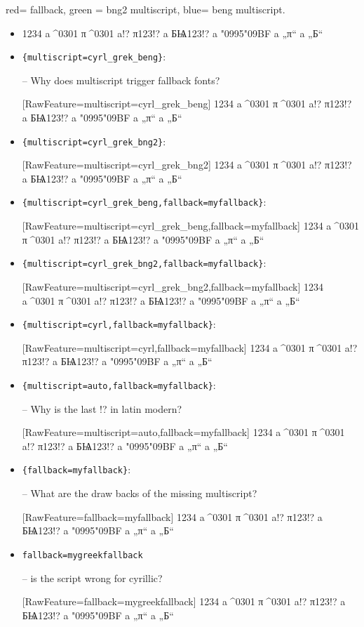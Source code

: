 \documentclass{article}
\newcommand\testtext{1234 a^^^^0301 π^^^^0301 a!? π123!? a БѨ123!? a \char"0995\char"09BF a „π“ a „Б“}
\begin{document}
red= fallback, green = bng2 multiscript, blue= beng multiscript.

\begin{itemize}
\item \testtext

\item \verb+{multiscript=cyrl_grek_beng}+:

-- Why does multiscript trigger fallback fonts?

[RawFeature={multiscript=cyrl_grek_beng}]
\testtext

\item \verb+{multiscript=cyrl_grek_bng2}+:

[RawFeature={multiscript=cyrl_grek_bng2}]
\testtext

\item \verb+{multiscript=cyrl_grek_beng,fallback=myfallback}+:

[RawFeature={multiscript=cyrl_grek_beng,fallback=myfallback}]
\testtext

\item \verb+{multiscript=cyrl_grek_bng2,fallback=myfallback}+:

[RawFeature={multiscript=cyrl_grek_bng2,fallback=myfallback}]
\testtext

\item \verb+{multiscript=cyrl,fallback=myfallback}+:

[RawFeature={multiscript=cyrl,fallback=myfallback}]
\testtext

\item \verb+{multiscript=auto,fallback=myfallback}+:

-- Why is the last !? in latin modern?

[RawFeature={multiscript=auto,fallback=myfallback}]
\testtext

\item \verb+{fallback=myfallback}+:

-- What are the draw backs of the missing multiscript?

[RawFeature={fallback=myfallback}]
\testtext

\item \verb+fallback=mygreekfallback+

-- is the script wrong for cyrillic?

[RawFeature={fallback=mygreekfallback}]
\testtext


\end{itemize}
\end{document}
